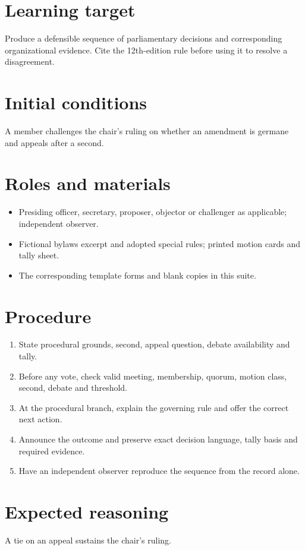 \documentclass[11pt]{article}
\begin{document}
\SuiteOpen
\section{Learning target}
Produce a defensible sequence of parliamentary decisions and corresponding organizational evidence. Cite the 12th-edition rule before using it to resolve a disagreement.

\section{Initial conditions}
A member challenges the chair’s ruling on whether an amendment is germane and appeals after a second.

\section{Roles and materials}
\begin{itemize}[leftmargin=*,itemsep=4pt]
\item Presiding officer, secretary, proposer, objector or challenger as applicable; independent observer.
\item Fictional bylaws excerpt and adopted special rules; printed motion cards and tally sheet.
\item The corresponding template forms and blank copies in this suite.
\end{itemize}

\section{Procedure}
\begin{enumerate}[leftmargin=*,itemsep=4pt]
\item State procedural grounds, second, appeal question, debate availability and tally.
\item Before any vote, check valid meeting, membership, quorum, motion class, second, debate and threshold.
\item At the procedural branch, explain the governing rule and offer the correct next action.
\item Announce the outcome and preserve exact decision language, tally basis and required evidence.
\item Have an independent observer reproduce the sequence from the record alone.
\end{enumerate}

\section{Expected reasoning}
A tie on an appeal sustains the chair’s ruling.
\end{document}
